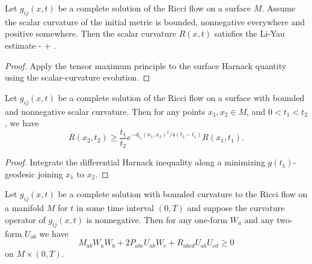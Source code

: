 \begin{theorem}
  \label{thm:cz-surface-ricci-flow-differential-harnack-estimate}
Let $g_{ij}(x,t)$ be a complete solution of the Ricci flow on a
surface $M$. Assume the scalar curvature of the initial metric is
bounded, nonnegative everywhere and positive somewhere. Then the
scalar curvature $R(x,t)$ satisfies the Li-Yau estimate \be
{} -  +
 .%
\ee
\end{theorem}

\begin{proof}
  \sketch Apply the tensor maximum principle to the surface Harnack quantity using the scalar-curvature evolution.
\end{proof}

\begin{corollary}
  \label{cor:cz-surface-ricci-flow-integrated-harnack-estimate}
Let $g_{ij}(x,t)$ be a complete solution of the Ricci flow on a
surface with bounded and nonnegative scalar curvature. Then for
any points $x_{1},x_{2}\in M$, and $0<t_{1}<t_{2}$, we have
$$
R(x_2,t_2)
\geq\frac{t_1}{t_2}e^{-d_{t_1}{(x_1,x_2)}^2/{4(t_2-t_1)}}R(x_1,t_1).
$$
\end{corollary}

\begin{proof}
  \sketch Integrate the differential Harnack inequality along a minimizing $g(t_1)$-geodesic joining $x_1$ to $x_2$.
\end{proof}

\begin{theorem}
  \label{thm:cz-matrix-liyauhamilton-estimate}
Let $g_{ij}(x,t)$ be a complete solution with bounded curvature to
the Ricci flow on a manifold $M$ for $t$ in some time interval
$(0,T)$ and suppose the curvature operator of $g_{ij}(x,t)$ is
nonnegative. Then for any one-form $W_a$ and any two-form $U_{ab}$
we have
$$
M_{ab}W_aW_b+2P_{abc}U_{ab}W_c+R_{abcd}U_{ab}U_{cd}\geq 0
$$
on $M\times (0,T)$.
\end{theorem}

